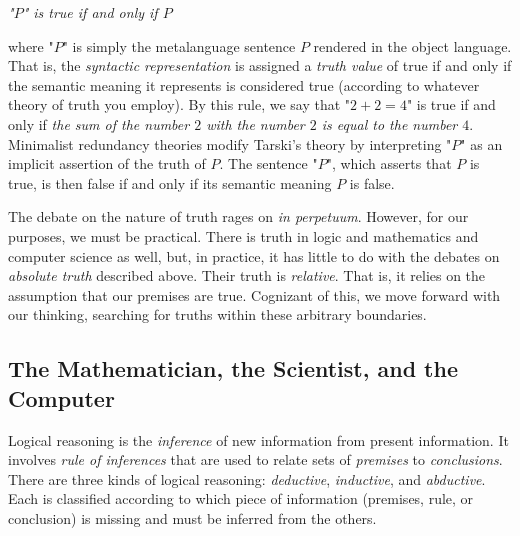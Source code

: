 \begin{tcolorbox}[breakable, enhanced, colback=textbook-blue, sharp corners]
	\begin{center}
		\textit{"$P$" is true if and only if $P$}
	\end{center}
	
	where "$P$" is simply the metalanguage sentence $P$ rendered in the object language. That is, the \textit{syntactic representation} is assigned a \textit{truth value} of true if and only if the semantic meaning it represents is considered true (according to whatever theory of truth you employ). By this rule, we say that "$2+2=4$" is true if and only if \textit{the sum of the number $2$ with the number $2$ is equal to the number $4$}. Minimalist redundancy theories modify Tarski's theory by interpreting "$P$" as an implicit assertion of the truth of $P$. The sentence "$P$", which asserts that $P$ is true, is then false if and only if its semantic meaning $P$ is false. \\
	
	\parbreak
	\vspace{4mm}
	
	The debate on the nature of truth rages on \textit{in perpetuum}. However, for our purposes, we must be practical. There is truth in logic and mathematics and computer science as well, but, in practice, it has little to do with the debates on \textit{absolute truth} described above. Their truth is \textit{relative}. That is, it relies on the assumption that our premises are true. Cognizant of this, we move forward with our thinking, searching for truths within these arbitrary boundaries. \\
	\vspace{1mm}
\end{tcolorbox}
\vspace{7mm}


\subsection*{The Mathematician, the Scientist, and the Computer}


Logical reasoning is the \textit{inference} of new information from present information. It involves \textit{rule of inferences} that are used to relate sets of \textit{premises} to \textit{conclusions}. There are three kinds of logical reasoning: \textit{deductive}, \textit{inductive}, and \textit{abductive}. Each is classified according to which piece of information (premises, rule, or conclusion) is missing and must be inferred from the others. \\

